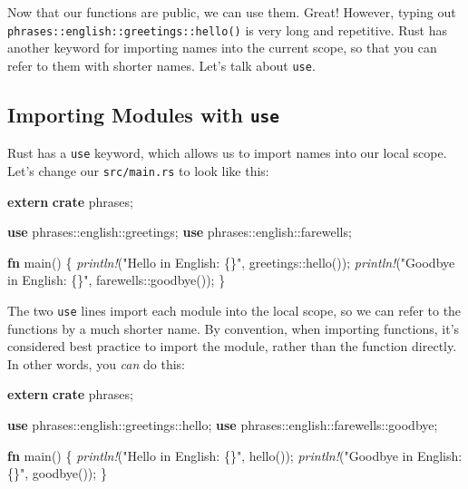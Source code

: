 \documentclass[a4paper,]{book}
\newenvironment{Shaded}{\begin{snugshade}}{\end{snugshade}}
\newcommand{\KeywordTok}[1]{\textcolor[rgb]{0.13,0.29,0.53}{\textbf{{#1}}}}
\newcommand{\StringTok}[1]{\textcolor[rgb]{0.31,0.60,0.02}{{#1}}}
\newcommand{\PreprocessorTok}[1]{\textcolor[rgb]{0.56,0.35,0.01}{\textit{{#1}}}}
\newcommand{\NormalTok}[1]{{#1}}
\begin{document}
Now that our functions are public, we can use them. Great! However,
typing out \texttt{phrases::english::greetings::hello()} is very long
and repetitive. Rust has another keyword for importing names into the
current scope, so that you can refer to them with shorter names. Let's
talk about \texttt{use}.

\subsection{\texorpdfstring{Importing Modules with
\texttt{use}}{Importing Modules with use}}\label{importing-modules-with-use}

Rust has a \texttt{use} keyword, which allows us to import names into
our local scope. Let's change our \texttt{src/main.rs} to look like
this:

\begin{Shaded}
\begin{Highlighting}[]
\KeywordTok{extern} \KeywordTok{crate} \NormalTok{phrases;}

\KeywordTok{use} \NormalTok{phrases::english::greetings;}
\KeywordTok{use} \NormalTok{phrases::english::farewells;}

\KeywordTok{fn} \NormalTok{main() \{}
    \PreprocessorTok{println!}\NormalTok{(}\StringTok{"Hello in English: \{\}"}\NormalTok{, greetings::hello());}
    \PreprocessorTok{println!}\NormalTok{(}\StringTok{"Goodbye in English: \{\}"}\NormalTok{, farewells::goodbye());}
\NormalTok{\}}
\end{Highlighting}
\end{Shaded}

The two \texttt{use} lines import each module into the local scope, so
we can refer to the functions by a much shorter name. By convention,
when importing functions, it's considered best practice to import the
module, rather than the function directly. In other words, you
\emph{can} do this:

\begin{Shaded}
\begin{Highlighting}[]
\KeywordTok{extern} \KeywordTok{crate} \NormalTok{phrases;}

\KeywordTok{use} \NormalTok{phrases::english::greetings::hello;}
\KeywordTok{use} \NormalTok{phrases::english::farewells::goodbye;}

\KeywordTok{fn} \NormalTok{main() \{}
    \PreprocessorTok{println!}\NormalTok{(}\StringTok{"Hello in English: \{\}"}\NormalTok{, hello());}
    \PreprocessorTok{println!}\NormalTok{(}\StringTok{"Goodbye in English: \{\}"}\NormalTok{, goodbye());}
\NormalTok{\}}
\end{Highlighting}
\end{Shaded}
\end{document}
